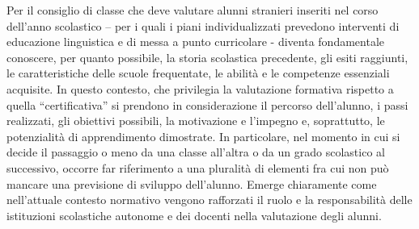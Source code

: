 Per il consiglio di classe che deve valutare alunni stranieri inseriti nel corso dell'anno
scolastico – per i quali i piani individualizzati prevedono interventi di educazione
linguistica e di messa a punto curricolare - diventa fondamentale conoscere, per quanto
possibile, la storia scolastica precedente, gli esiti raggiunti, le caratteristiche delle scuole
frequentate, le abilità e le competenze essenziali acquisite. In questo contesto, che privilegia
la valutazione formativa rispetto a quella “certificativa” si prendono in considerazione il
percorso dell'alunno, i passi realizzati, gli obiettivi possibili, la motivazione e l'impegno e,
soprattutto, le potenzialità di apprendimento dimostrate. In particolare, nel momento in cui
si decide il passaggio o meno da una classe all'altra o da un grado scolastico al successivo,
occorre far riferimento a una pluralità di elementi fra cui non può mancare una previsione di
sviluppo dell'alunno. Emerge chiaramente come nell'attuale contesto normativo vengono
rafforzati il ruolo e la responsabilità delle istituzioni scolastiche autonome e dei docenti
nella valutazione degli alunni.
